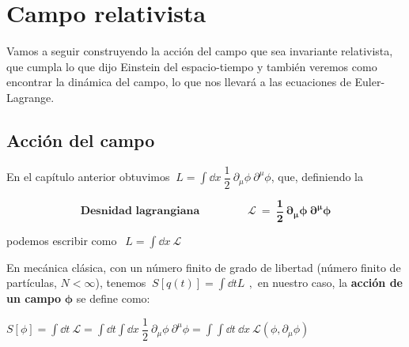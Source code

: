 \chapter{Campo relativista}


\vspace{10mm}
\begin{adjustwidth}{50pt}{50pt}
\begin{ejemplo}
Vamos a seguir construyendo la acción del campo que sea invariante relativista, que cumpla lo que dijo Einstein del espacio-tiempo y también veremos como encontrar la dinámica del campo, lo que nos llevará a las ecuaciones de Euler-Lagrange.
\end{ejemplo}
\end{adjustwidth}
\vspace{5mm}

\section{Acción del campo}

En el capítulo anterior obtuvimos $\ \displaystyle L=\int \dd x \ \dfrac 1 2 \  \partial_\mu \phi \  \partial^\mu \phi $, que, definiendo la 

\begin{definition}

\begin{equation}
\label{T20DensLagran}
\textbf{Desnidad lagrangiana } \qquad \qquad \boldsymbol{ \mathcal L \ = \ \dfrac 1 2 \  \partial_\mu \phi \ \partial^\mu \phi	}
\end{equation}	
\end{definition}

podemos escribir como $\displaystyle \ \ L=\int \dd x \ \mathcal L$

En mecánica clásica, con un número finito de grado de libertad (número finito de partículas, $N< \infty$), tenemos $\ S[q(t)]=\displaystyle \int \dd t L \, \ , $ en nuestro caso, la \textbf{acción de un campo} $\boldsymbol \phi$  se define como: 

$S[\phi]=\displaystyle \int \dd t \ \mathcal L = \int \dd t \int \dd x \ \dfrac 1 2 \  \partial_\mu \phi \  \partial^\mu \phi = \int \int \dd t \ \dd x \ \mathcal L(\phi, \partial_\mu \phi)$

